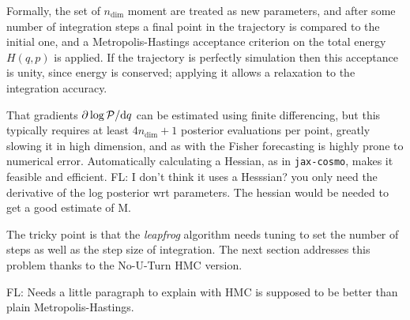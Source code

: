 \documentclass[twocolumn,twocolappendix,nofootinbib,iop]{openjournal}
\newcommand{\FrL}[1]{{\color{cyan}FL: #1}}
\newcommand{\jaxcosmo}{\texttt{jax-cosmo}}
\begin{document}
Formally, the set of $n_\mathrm{dim}$ moment are treated as new parameters, and after 
some number of integration steps a final point in the trajectory is compared to the initial one,
and a Metropolis-Hastings acceptance criterion on the total energy $H(q,p)$ is applied. If the trajectory is perfectly simulation then this acceptance is unity, since energy is conserved; applying it allows
a relaxation to the integration accuracy.

That gradients $\partial \log{\cal P} / \mathrm{d} q$ can be estimated using finite differencing,
but this typically requires at least $4 n_{\mathrm{dim}} + 1$ posterior evaluations per point, greatly slowing it
in high dimension, and as with the Fisher forecasting is highly prone to numerical error. Automatically
calculating a Hessian, as in \jaxcosmo, makes it feasible and efficient. \FrL{I don't think it uses a Hesssian? you only need the derivative of the log posterior wrt parameters. The hessian would be needed to get a good estimate of M.}

The tricky point is that the \textit{leapfrog} algorithm needs tuning to set the number of steps as well as the step size of integration. The next section addresses this problem thanks to the No-U-Turn HMC version.

\FrL{Needs a little paragraph to explain with HMC is supposed to be better than plain Metropolis-Hastings.}
\end{document}
